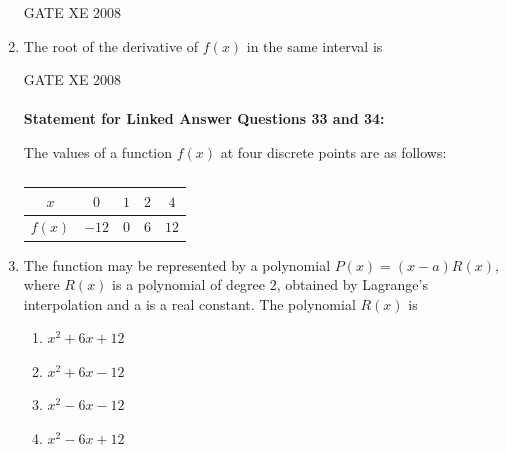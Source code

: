 \documentclass[12pt]{article}
\begin{document}
\begin{enumerate}[label=Q\arabic*.]
\begin{enumerate}[label=(\Alph*)]
\end{enumerate}

GATE XE 2008

\item The root of the derivative of $f(x)$ in the same interval is

\begin{enumerate}[label=(\Alph*)]
\end{enumerate}

GATE XE 2008
\\ \\
\textbf{Statement for Linked Answer Questions 33 and 34:}

The values of a function $f(x)$ at four discrete points are as follows:
\begin{center}
\begin{table}[H]     \centering     \caption{}     \label{}     \begin{tabular}{|c|c|c|c|c|}
\hline
   $x$  & $0$ & $1$ & $2$ & $4$\\
   \hline
  $f(x)$   & $-12$ & $0$ & $6$ & $12$\\
  \hline
\end{tabular} \end{table}
\end{center}

\item  The function may be represented by a polynomial $P(x)=(x-a)R(x)$, where $R(x)$ is a polynomial of degree $2$, obtained by Lagrange's interpolation and a is a real constant. The polynomial $R(x)$ is

\begin{enumerate}[label=(\Alph*)]
\item  $x^2+6x+12$
\item  $x^2+6x-12$
\item  $x^2-6x-12$
\item  $x^2-6x+12$
\end{enumerate}


\end{enumerate}
\end{document}
